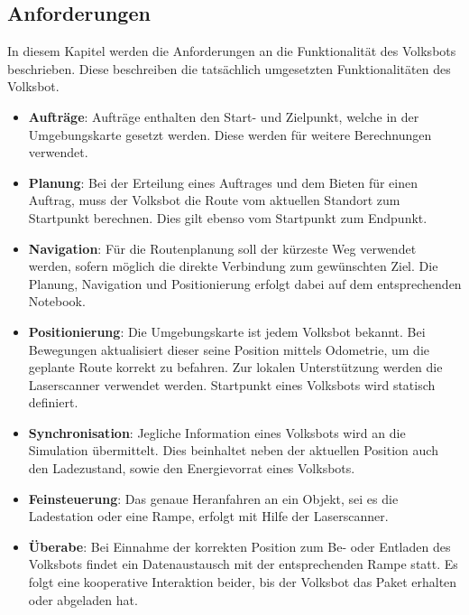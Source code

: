 \subsection{Anforderungen}

In diesem Kapitel werden die Anforderungen an die Funktionalität des Volksbots beschrieben. Diese beschreiben die tatsächlich umgesetzten Funktionalitäten des Volksbot.


\begin{itemize}

\item \textbf{Aufträge}: Aufträge enthalten den Start- und Zielpunkt, welche in der Umgebungskarte gesetzt werden. Diese werden für weitere Berechnungen verwendet.

\item \textbf{Planung}: Bei der Erteilung eines Auftrages und dem Bieten für einen Auftrag, muss der Volksbot die Route vom aktuellen Standort zum Startpunkt berechnen. Dies gilt ebenso vom Startpunkt zum Endpunkt.

\item \textbf{Navigation}: Für die Routenplanung soll der kürzeste Weg verwendet werden, sofern möglich die direkte Verbindung zum gewünschten Ziel. Die Planung, Navigation und Positionierung erfolgt dabei auf dem entsprechenden Notebook.

\item \textbf{Positionierung}: Die Umgebungskarte ist jedem Volksbot bekannt. Bei Bewegungen aktualisiert dieser seine Position mittels Odometrie, um die geplante Route korrekt zu befahren. Zur lokalen Unterstützung werden die Laserscanner verwendet werden. Startpunkt eines Volksbots wird statisch definiert.

\item \textbf{Synchronisation}: Jegliche Information eines Volksbots wird an die Simulation übermittelt. Dies beinhaltet neben der aktuellen Position auch den Ladezustand, sowie den Energievorrat eines Volksbots.

\item \textbf{Feinsteuerung}: Das genaue Heranfahren an ein Objekt, sei es die Ladestation oder eine Rampe, erfolgt mit Hilfe der Laserscanner. 

\item \textbf{Überabe}: Bei Einnahme der korrekten Position zum Be- oder Entladen des Volksbots findet ein Datenaustausch mit der entsprechenden Rampe statt. Es folgt eine kooperative Interaktion beider, bis der Volksbot das Paket erhalten oder abgeladen hat.

\end{itemize}